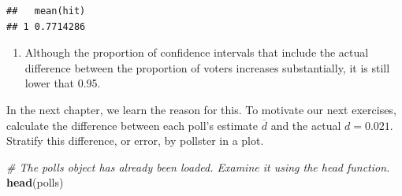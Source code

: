 \documentclass[
]{article}
\newenvironment{Shaded}{\begin{snugshade}}{\end{snugshade}}
\newcommand{\CommentTok}[1]{\textcolor[rgb]{0.56,0.35,0.01}{\textit{#1}}}
\newcommand{\KeywordTok}[1]{\textcolor[rgb]{0.13,0.29,0.53}{\textbf{#1}}}
\newcommand{\NormalTok}[1]{#1}
\providecommand{\tightlist}{%
  \setlength{\itemsep}{0pt}\setlength{\parskip}{0pt}}
\begin{document}
\begin{verbatim}
##   mean(hit)
## 1 0.7714286
\end{verbatim}

\begin{enumerate}
\def\labelenumi{\arabic{enumi}.}
\setcounter{enumi}{7}
\tightlist
\item
  Although the proportion of confidence intervals that include the
  actual difference between the proportion of voters increases
  substantially, it is still lower that 0.95.
\end{enumerate}

In the next chapter, we learn the reason for this. To motivate our next
exercises, calculate the difference between each poll's estimate
\(\overline{d}\) and the actual \(d = 0.021\). Stratify this difference,
or error, by pollster in a plot.

\begin{Shaded}
\begin{Highlighting}[]
\CommentTok{\# The \textasciigrave{}polls\textasciigrave{} object has already been loaded. Examine it using the \textasciigrave{}head\textasciigrave{} function.}
\KeywordTok{head}\NormalTok{(polls)}
\end{Highlighting}
\end{Shaded}
\end{document}

